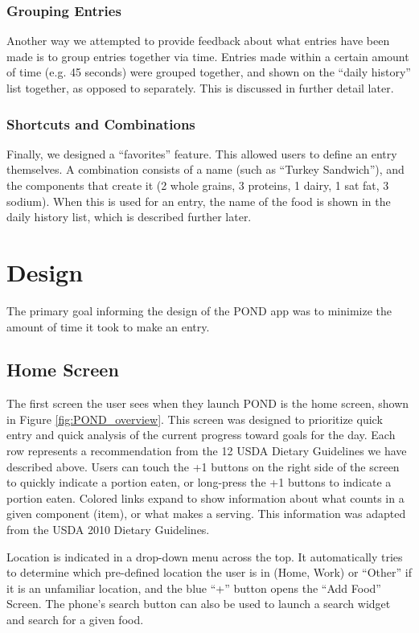 \subsubsection{Grouping Entries}
Another way we attempted to provide feedback about what entries have been made is to group entries together via time. Entries made within a certain amount of time (e.g. 45 seconds) were grouped together, and shown on the ``daily history'' list together, as opposed to separately. This is discussed in further detail later. 

\subsubsection{Shortcuts and Combinations}

Finally, we designed a ``favorites'' feature. This allowed users to define an entry themselves. A combination consists of a name (such as ``Turkey Sandwich''), and the components that create it (2 whole grains, 3 proteins, 1 dairy, 1 sat fat, 3 sodium). When this is used for an entry, the name of the food is shown in the daily history list, which is described further later. 

\section{Design}
The primary goal informing the design of the POND app was to minimize the amount of time it took to make an entry. 

\subsection{Home Screen}
The first screen the user sees when they launch POND is the home screen, shown in Figure \ref{fig:POND_overview}. This screen was designed to prioritize quick entry and quick analysis of the current progress toward goals for the day. Each row represents a recommendation from the 12 USDA Dietary Guidelines we have described above. Users can touch the +1 buttons on the right side of the screen to quickly indicate a portion eaten, or long-press the +1 buttons to indicate a \textonehalf portion eaten. Colored links expand to show information about what counts in a given component (item), or what makes a serving. This information was adapted from the USDA 2010 Dietary Guidelines. 

Location is indicated in a drop-down menu across the top. It automatically tries to determine which pre-defined location the user is in (Home, Work) or ``Other'' if it is an unfamiliar location, and the blue ``+'' button opens the ``Add Food'' Screen. The phone's search button can also be used to launch a search widget and search for a given food. 

